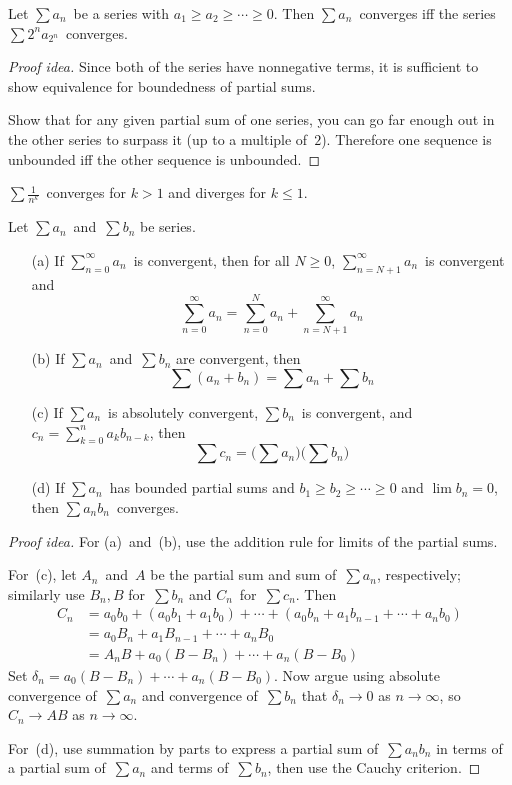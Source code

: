 \begin{thm}
Let \(\sum a_n\)~be a series with \(a_1\ge a_2\ge\cdots\ge0\). Then \(\sum a_n\)~converges iff the series \(\sum 2^n a_{2^n}\)~converges.
\end{thm}
\begin{proof}[Proof idea]
Since both of the series have nonnegative terms, it is sufficient to show equivalence for boundedness of partial sums.

Show that for any given partial sum of one series, you can go far enough out in the other series to surpass it (up to a multiple of~\(2\)). Therefore one sequence is unbounded iff the other sequence is unbounded.
\end{proof}
\begin{app}
\(\sum\frac{1}{n^k}\)~converges for \(k>1\) and diverges for \(k\le 1\).
\end{app}

\begin{thm}
Let \(\sum a_n\)~and~\(\sum b_n\) be series.
\begin{enumerate}[itemsep=0pt]
\item[(a)] If \(\sum_{n=0}^\infty a_n\)~is convergent, then for all \(N\ge0\), \(\sum_{n=N+1}^{\infty}a_n\)~is convergent and
\[\sum_{n=0}^{\infty}a_n=\sum_{n=0}^N a_n+\sum_{n=N+1}^\infty a_n\]
\item[(b)] If \(\sum a_n\)~and~\(\sum b_n\) are convergent, then
\[\sum(a_n+b_n)=\sum a_n+\sum b_n\]
\item[(c)] If \(\sum a_n\)~is absolutely convergent, \(\sum b_n\)~is convergent, and \(c_n=\sum_{k=0}^n a_kb_{n-k}\), then
\[\sum c_n=\bigl(\sum a_n\bigr)\bigl(\sum b_n\bigr)\]
\item[(d)] If \(\sum a_n\)~has bounded partial sums and \(b_1\ge b_2\ge\cdots\ge0\) and \(\lim b_n=0\), then \(\sum a_nb_n\)~converges.
\end{enumerate}
\end{thm}
\begin{proof}[Proof idea]
For (a)~and~(b), use the addition rule for limits of the partial sums.

For~(c), let \(A_n\)~and~\(A\) be the partial sum and sum of~\(\sum a_n\), respectively; similarly use \(B_n,B\) for~\(\sum b_n\) and \(C_n\)~for~\(\sum c_n\). Then
\begin{align*}
C_n&=a_0b_0+(a_0b_1+a_1b_0)+\cdots+(a_0b_n+a_1b_{n-1}+\cdots+a_nb_0)\\
	&=a_0B_n+a_1B_{n-1}+\cdots+a_nB_0\\
	&=A_nB+a_0(B-B_n)+\cdots+a_n(B-B_0)
\end{align*}
Set \(\delta_n=a_0(B-B_n)+\cdots+a_n(B-B_0)\). Now argue using absolute convergence of~\(\sum a_n\) and convergence of~\(\sum b_n\) that \(\delta_n\to 0\) as \(n\to\infty\), so \(C_n\to AB\) as \(n\to\infty\).

For~(d), use summation by parts to express a partial sum of~\(\sum a_nb_n\) in terms of a partial sum of~\(\sum a_n\) and terms of~\(\sum b_n\), then use the Cauchy criterion.
\end{proof}

